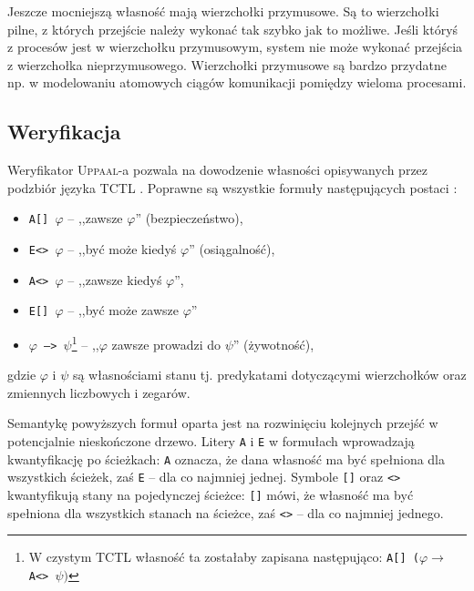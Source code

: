 \documentclass{pracamgr}
\newcommand{\upp}{\textsc{Uppaal}}
\theoremstyle{plain}
\begin{document}
Jeszcze mocniejszą własność mają wierzchołki przymusowe. Są to
wierzchołki pilne, z których przejście należy wykonać tak szybko jak
to możliwe. Jeśli któryś z procesów jest w wierzchołku przymusowym,
system nie może wykonać przejścia z wierzchołka nieprzymusowego.
Wierzchołki przymusowe są bardzo przydatne np. w modelowaniu atomowych
ciągów komunikacji pomiędzy wieloma procesami.

\subsection{Weryfikacja}

Weryfikator \upp-a pozwala na dowodzenie własności opisywanych przez
podzbiór języka TCTL \cite{acd:mc}. Poprawne są wszystkie formuły
następujących postaci \cite{by-lncs04}:
\begin{itemize}
  \item \texttt{A[] $\varphi$} -- ,,zawsze $\varphi$'' (bezpieczeństwo),
  \item \texttt{E<> $\varphi$} -- ,,być może kiedyś $\varphi$''
  (osiągalność),
  \item \texttt{A<> $\varphi$} -- ,,zawsze kiedyś $\varphi$'',
  \item \texttt{E[] $\varphi$} -- ,,być może zawsze $\varphi$''
  \item \texttt{$\varphi$ --> $\psi$}\footnote{W czystym TCTL własność
    ta zostałaby zapisana następująco: \texttt{A[]
      ($\varphi\rightarrow$ A<> $\psi)$}} -- ,,$\varphi$ zawsze
  prowadzi do $\psi$'' (żywotność),
\end{itemize}
gdzie $\varphi$ i $\psi$ są własnościami stanu tj. predykatami
dotyczącymi wierzchołków oraz zmiennych liczbowych i zegarów.

Semantykę powyższych formuł oparta jest na rozwinięciu kolejnych
przejść w potencjalnie nieskończone drzewo. Litery \texttt{A} i
\texttt{E} w formułach wprowadzają kwantyfikację po ścieżkach:
\texttt{A} oznacza, że dana własność ma być spełniona dla wszystkich
ścieżek, zaś \texttt{E} -- dla co najmniej jednej. Symbole
\texttt{[]} oraz \texttt{<>} kwantyfikują stany na pojedynczej
ścieżce: \texttt{[]} mówi, że własność ma być spełniona dla wszystkich
stanach na ścieżce, zaś \texttt{<>} -- dla co najmniej jednego. 
\end{document}
